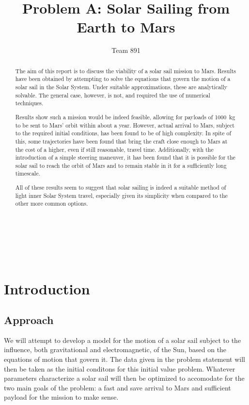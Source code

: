 \documentclass[twocolumn,12pt,a4paper]{article}
\author{\textsf{Team 891}}
\title{\textsf{\textbf{Problem A: Solar Sailing from Earth to Mars}}}
\date{}
\numberwithin{equation}{section}
\begin{document}
\renewcommand{\abstractname}{}
\renewcommand{\absnamepos}{empty}
\begin{titlingpage}
 \maketitle

\noindent \hrulefill \\
\begin{abstract}
The aim of this report is to discuss the viability of a solar sail mission to Mars. Results have been obtained by attempting to solve the equations that govern the motion of a solar sail in the Solar System. Under suitable approximations, these are analytically solvable. The general case, however, is not, and required the use of numerical techniques. 

Results show such a mission would be indeed feasible, allowing for payloads of \SI{1000}{kg} to be sent to Mars' orbit within about a year. However, actual arrival to Mars, subject to the required initial conditions, has been found to be of high complexity. In spite of this, some trajectories have been found that bring the craft close enough to Mars at the cost of a higher, even if still reasonable, travel time. Additionally, with the introduction of a simple steering maneuver, it has been found that it is possible for the solar sail to reach the orbit of Mars and to remain stable in it for a sufficiently long timescale.

All of these results seem to suggest that solar sailing is indeed a suitable method of light inner Solar System travel, especially given its simplicity when compared to the other more common options. 
\end{abstract}
\hrulefill \\
\end{titlingpage}

\begin{titlingpage}
\tableofcontents
\end{titlingpage}

\section{Introduction}

\subsection{Approach}
We will attempt to develop a model for the motion of a solar sail subject to the influence, both gravitational and electromagnetic, of the Sun, based on the equations of motion that govern it. The data given in the problem statement will then be taken as the initial conditons for this initial value problem. Whatever parameters characterize a solar sail will then be optimized to accomodate for the two main goals of the problem: a fast and save arrival to Mars and sufficient payload for the mission to make sense.
\end{document}
